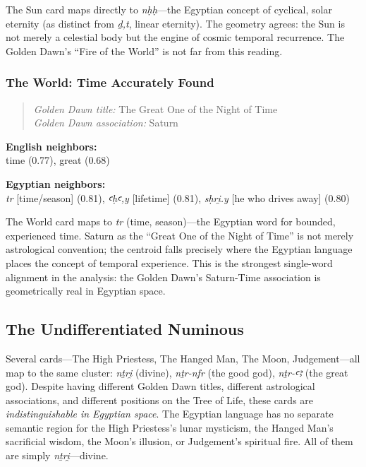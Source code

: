 \documentclass[11pt, a4paper]{article}
\begin{document}
\vspace{6pt}
 The Sun card maps directly to \textit{nḥḥ}---the Egyptian concept of cyclical, solar eternity (as distinct from \textit{ḏ,t}, linear eternity). The geometry agrees: the Sun is not merely a celestial body but the engine of cosmic temporal recurrence. The Golden Dawn's ``Fire of the World'' is not far from this reading.

\subsubsection{The World: Time Accurately Found}

\begin{quote}
\textit{Golden Dawn title:} The Great One of the Night of Time \\
\textit{Golden Dawn association:} Saturn
\end{quote}

\noindent\textbf{English neighbors:}\\
\hspace{1em}time (0.77), great (0.68)

\noindent\textbf{Egyptian neighbors:}\\
\hspace{1em}\textit{tr} [time/season] (0.81), \textit{ꜥḥꜥ,y} [lifetime] (0.81), \textit{sḥri̯.y} [he who drives away] (0.80)

\vspace{6pt}
 The World card maps to \textit{tr} (time, season)---the Egyptian word for bounded, experienced time. Saturn as the ``Great One of the Night of Time'' is not merely astrological convention; the centroid falls precisely where the Egyptian language places the concept of temporal experience. This is the strongest single-word alignment in the analysis: the Golden Dawn's Saturn-Time association is geometrically real in Egyptian space.

\subsection{The Undifferentiated Numinous}

Several cards---The High Priestess, The Hanged Man, The Moon, Judgement---all map to the same cluster: \textit{nṯri̯} (divine), \textit{nṯr-nfr} (the good god), \textit{nṯr-ꜥꜣ} (the great god). Despite having different Golden Dawn titles, different astrological associations, and different positions on the Tree of Life, these cards are \textit{indistinguishable in Egyptian space}. The Egyptian language has no separate semantic region for the High Priestess's lunar mysticism, the Hanged Man's sacrificial wisdom, the Moon's illusion, or Judgement's spiritual fire. All of them are simply \textit{nṯri̯}---divine.
\end{document}
